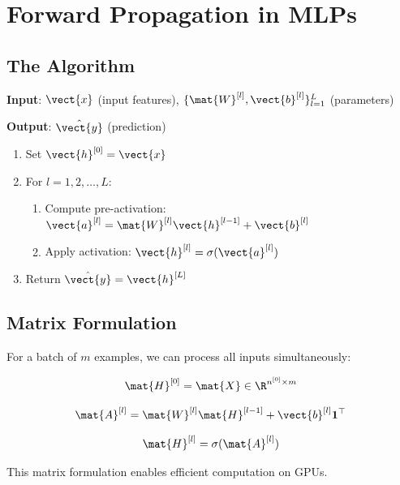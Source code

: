 
\section{Forward Propagation in MLPs}

\subsection{The Algorithm}

\begin{tcolorbox}[title=Forward Propagation Algorithm]
\textbf{Input}: $\vect{x}$ (input features), $\{\mat{W}^{[l]}, \vect{b}^{[l]}\}_{l=1}^{L}$ (parameters)

\textbf{Output}: $\hat{\vect{y}}$ (prediction)

\begin{enumerate}
    \item Set $\vect{h}^{[0]} = \vect{x}$
    \item For $l = 1, 2, \ldots, L$:
    \begin{enumerate}
        \item Compute pre-activation: $\vect{a}^{[l]} = \mat{W}^{[l]} \vect{h}^{[l-1]} + \vect{b}^{[l]}$
        \item Apply activation: $\vect{h}^{[l]} = \sigma(\vect{a}^{[l]})$
    \end{enumerate}
    \item Return $\hat{\vect{y}} = \vect{h}^{[L]}$
\end{enumerate}
\end{tcolorbox}

\subsection{Matrix Formulation}

For a batch of $m$ examples, we can process all inputs simultaneously:

\[
\mat{H}^{[0]} = \mat{X} \in \R^{n^{[0]} \times m}
\]

\[
\mat{A}^{[l]} = \mat{W}^{[l]} \mat{H}^{[l-1]} + \vect{b}^{[l]} \mathbf{1}^\top
\]

\[
\mat{H}^{[l]} = \sigma(\mat{A}^{[l]})
\]

This matrix formulation enables efficient computation on GPUs.

